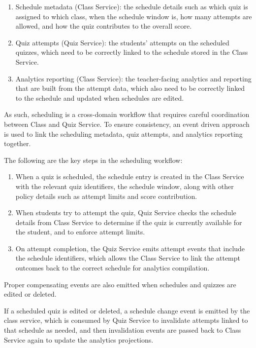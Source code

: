 \documentclass[
  12pt,
  a4paper,
]{report}
\begin{document}
\begin{enumerate}
  \item Schedule metadata (Class Service): the schedule details such as which quiz is assigned to which class,
  when the schedule window is, how many attempts are allowed, and how the quiz contributes to the overall score.
  \item Quiz attempts (Quiz Service): the students' attempts on the scheduled quizzes, which need to be correctly
  linked to the schedule stored in the Class Service.
  \item Analytics reporting (Class Service): the teacher-facing analytics and reporting that are built from
  the attempt data, which also need to be correctly linked to the schedule and updated when schedules are edited.
\end{enumerate}

As such, scheduling is a cross-domain workflow that requires careful coordination between Class and Quiz Service.
To ensure consistency, an event driven approach is used to link the scheduling metadata, quiz attempts, and analytics reporting together.

The following are the key steps in the scheduling workflow:

\begin{enumerate}
  \item When a quiz is scheduled, the schedule entry is created in the Class
    Service with the relevant quiz identifiers, the schedule window, along
    with other policy details such as attempt limits and score contribution.
  \item When students try to attempt the quiz, Quiz Service checks the schedule
    details from Class Service to determine if the quiz is currently available for the student,
    and to enforce attempt limits.
  \item On attempt completion, the Quiz Service emits attempt events that include the schedule identifiers,
    which allows the Class Service to link the attempt outcomes back to the correct schedule for analytics compilation.
\end{enumerate}

Proper compensating events are also emitted when schedules and quizzes are edited or deleted.

If a scheduled quiz is edited or deleted, a schedule change event is emitted by the class service,
which is consumed by Quiz Service to invalidate attempts linked to that schedule as needed,
and then invalidation events are passed back to Class Service again to update the analytics projections.
\end{document}
